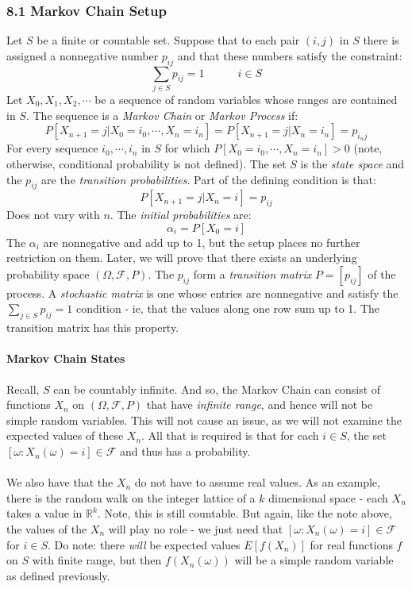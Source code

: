 \documentclass[12pt,a4paper]{article}
\newcommand{\1}[1]{\mathbbm{1}\left\{ #1 \right\}}
\newcommand{\R}{\mathbb{R}}
\newcommand{\fcal}{\mathcal{F}}
\begin{document}
\subsubsection{8.1 Markov Chain Setup} Let $S$ be a finite or countable set. Suppose that to each pair $(i,j)$ in $S$ there is assigned a nonnegative number $p_{ij}$ and that these numbers satisfy the constraint:
$$
	\sum_{j \in S} p_{ij} = 1 \quad\quad\quad i \in S
$$
Let $X_0, X_1, X_2, \cdots$ be a sequence of random variables whose ranges are contained in $S$. The sequence is a \textit{Markov Chain} or \textit{Markov Process} if:
$$
	P[X_{n + 1} = j | X_0 = i_0, \cdots, X_n = i_n] =
	P[X_{n + 1} = j | X_n = i_n] = p_{i_n j}
$$
For every sequence $i_0, \cdots, i_n$ in $S$ for which $P[X_0 = i_0, \cdots, X_n = i_n] > 0$ (note, otherwise, conditional probability is not defined). The set $S$ is the \textit{state space} and the $p_{ij}$ are the \textit{transition probabilities}. Part of the defining condition is that:
$$
	P[X_{n + 1} = j | X_n = i] = p_{ij}
$$
Does not vary with $n$. The \textit{initial probabilities} are:
$$
	\alpha_i = P[X_0 = i]
$$
The $\alpha_i$ are nonnegative and add up to 1, but the setup places no further restriction on them. Later, we will prove that there exists an underlying probability space $(\Omega, \fcal, P)$. The $p_{ij}$ form a \textit{transition matrix} $P = [p_{ij}]$ of the process. A \textit{stochastic matrix} is one whose entries are nonnegative and satisfy the $\sum_{j \in S} p_{ij} = 1$ condition - ie, that the values along one row sum up to 1. The transition matrix has this property.

\paragraph{Markov Chain States} Recall, $S$ can be countably infinite. And so, the Markov Chain can consist of functions $X_n$ on $(\Omega, \fcal, P)$ that have \textit{infinite range}, and hence will not be simple random variables. This will not cause an issue, as we will not examine the expected values of these $X_n$. All that is required is that for each $i \in S$, the set $[\omega : X_n(\omega) = i] \in \fcal$ and thus has a probability.
\\\\
We also have that the $X_n$ do not have to assume real values. As an example, there is the random walk on the integer lattice of a $k$ dimensional space - each $X_n$ takes a value in $\R^k$. Note, this is still countable. But again, like the note above, the values of the $X_n$ will play no role - we just need that $[\omega : X_n(\omega) = i] \in \fcal$ for $i \in S$. Do note: there \textit{will} be expected values $E[f(X_n)]$ for real functions $f$ on $S$ with finite range, but then $f(X_n(\omega))$ will be a simple random variable as defined previously.
\end{document}
